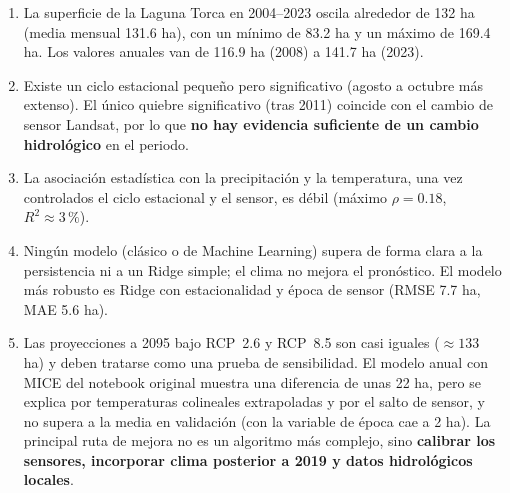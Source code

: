 \documentclass[11pt,a4paper]{article}
\begin{document}
\begin{enumerate}
\item La superficie de la Laguna Torca en 2004--2023 oscila alrededor de 132 ha (media mensual 131.6 ha), con un mínimo de 83.2 ha y un máximo de 169.4 ha. Los valores anuales van de 116.9 ha (2008) a 141.7 ha (2023).
\item Existe un ciclo estacional pequeño pero significativo (agosto a octubre más extenso). El único quiebre significativo (tras 2011) coincide con el cambio de sensor Landsat, por lo que \textbf{no hay evidencia suficiente de un cambio hidrológico} en el periodo.
\item La asociación estadística con la precipitación y la temperatura, una vez controlados el ciclo estacional y el sensor, es débil (máximo $\rho=0.18$, $R^2\approx3\,\%$).
\item Ningún modelo (clásico o de Machine Learning) supera de forma clara a la persistencia ni a un Ridge simple; el clima no mejora el pronóstico. El modelo más robusto es Ridge con estacionalidad y época de sensor (RMSE 7.7 ha, MAE 5.6 ha).
\item Las proyecciones a 2095 bajo RCP~2.6 y RCP~8.5 son casi iguales (${\approx}133$ ha) y deben tratarse como una prueba de sensibilidad. El modelo anual con MICE del notebook original muestra una diferencia de unas 22 ha, pero se explica por temperaturas colineales extrapoladas y por el salto de sensor, y no supera a la media en validación (con la variable de época cae a 2 ha). La principal ruta de mejora no es un algoritmo más complejo, sino \textbf{calibrar los sensores, incorporar clima posterior a 2019 y datos hidrológicos locales}.
\end{enumerate}
\end{document}
